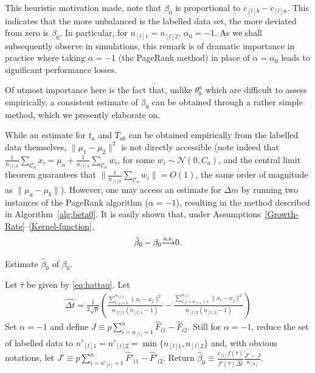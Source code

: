 \documentclass[twoside,11pt]{article}
\def\asto{ {\overset{\rm a.s.}{\longrightarrow}} }
\begin{document}
This heuristic motivation made, note that $\beta_0$ is proportional to $c_{[l]b}-c_{[l]a}$. This indicates that the more unbalanced is the labelled data set, the more deviated from zero is $\beta_0$. In particular, for $n_{[l]1}=n_{[l]2}$, $\alpha_0=-1$. As we shall subsequently observe in simulations, this remark is of dramatic importance in practice where taking $\alpha=-1$ (the PageRank method) in place of $\alpha=\alpha_0$ leads to significant performance losses.

\medskip

Of utmost importance here is the fact that, unlike $\theta_b^a$ which are difficult to assess empirically, a consistent estimate of $\beta_0$ can be obtained through a rather simple method, which we presently elaborate on.

While an estimate for $t_a$ and $T_{ab}$ can be obtained empirically from the labelled data themselves, $\|\mu_1-\mu_2\|^2$ is not directly accessible (note indeed that $\frac1{n_{[l]a}}\sum_{\mathcal C_a}x_i=\mu_a+\frac1{n_{[l]a}}\sum_{\mathcal C_a}w_i$, for some $w_i\sim\mathcal N(0,C_a)$, and the central limit theorem guarantees that $\|\frac1{n_{[l]a}}\sum_{\mathcal C_a}w_i\|=O(1)$, the same order of magnitude as $\|\mu_a-\mu_b\|$). However, one may access an estimate for $\Delta m$ by running two instances of the PageRank algorithm ($\alpha=-1$), resulting in the method described in Algorithm~\ref{alg:beta0}. It is easily shown that, under Assumptions~\ref{Growth-Rate}--\ref{Kernel-function},
\begin{align*}
	\hat \beta_0 - \beta_0 \asto 0.
\end{align*}

\begin{algorithm}
	\caption{Estimate $\hat{\beta}_0$ of $\beta_0$.}
\label{alg:beta0}
 \begin{algorithmic}[1]
	 \STATE Let $\hat \tau$ be given by \eqref{eq:hattau}.
	 \STATE Let
 \begin{align*}
	 \widehat{\Delta t} = \frac1{2\sqrt{p}} \left( \frac{\sum_{i,j=1}^{n_{[l]1}}\|x_i-x_j\|^2}{n_{[l]1}(n_{[l]1}-1)} - \frac{\sum_{i,j=n_{[l]1}+1}^{n_{[l]}}\|x_i-x_j\|^2}{n_{[l]2}(n_{[l]2}-1)} \right)
 \end{align*}
 \STATE Set $\alpha=-1$ and define $J \equiv p \sum_{i=n_{[l]}+1}^n \hat F_{i1}-\hat F_{i2}$.
 \STATE Still for $\alpha=-1$, reduce the set of labelled data to $n'_{[l]1}=n'_{[l]2}=\min\{n_{[l]1},n_{[l]2}\}$ and, with obvious notations, let $J' \equiv p \sum_{i=n'_{[l]}+1}^n \hat F'_{i1}-\hat F'_{i2}$.
 \STATE Return $\hat\beta_0 \equiv \frac{c_{[l]}f(\hat \tau)}{f'(\hat \tau) \widehat{\Delta t}} \frac{J'-J}{n_{[u]}}$.
\end{algorithmic}
\end{algorithm}
\end{document}
